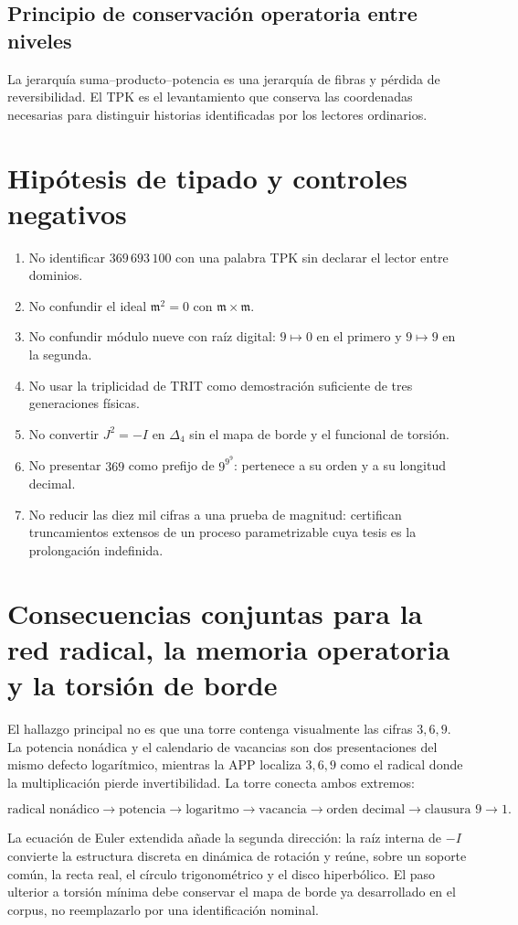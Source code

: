 \subsection{Principio de conservación operatoria entre niveles}

La jerarquía suma–producto–potencia es una jerarquía de fibras y pérdida de reversibilidad. El TPK es el levantamiento que conserva las coordenadas necesarias para distinguir historias identificadas por los lectores ordinarios.


\section{Hipótesis de tipado y controles negativos}

\begin{enumerate}
\item No identificar \(369\,693\,100\) con una palabra TPK sin declarar el lector entre dominios.
\item No confundir el ideal \(\mathfrak m^2=0\) con \(\mathfrak m\times\mathfrak m\).
\item No confundir módulo nueve con raíz digital: \(9\mapsto0\) en el primero y \(9\mapsto9\) en la segunda.
\item No usar la triplicidad de TRIT como demostración suficiente de tres generaciones físicas.
\item No convertir \(J^2=-I\) en \(\Delta_4\) sin el mapa de borde y el funcional de torsión.
\item No presentar \(369\) como prefijo de \(9^{9^9}\): pertenece a su orden y a su longitud decimal.
\item No reducir las diez mil cifras a una prueba de magnitud: certifican truncamientos extensos de un proceso parametrizable cuya tesis es la prolongación indefinida.
\end{enumerate}

\section{Consecuencias conjuntas para la red radical, la memoria operatoria y la torsión de borde}

El hallazgo principal no es que una torre contenga visualmente las cifras \(3,6,9\). La potencia nonádica y el calendario de vacancias son dos presentaciones del mismo defecto logarítmico, mientras la APP localiza \(3,6,9\) como el radical donde la multiplicación pierde invertibilidad. La torre conecta ambos extremos:

\[
\text{radical nonádico}
\longrightarrow
\text{potencia}
\longrightarrow
\text{logaritmo}
\longrightarrow
\text{vacancia}
\longrightarrow
\text{orden decimal}
\longrightarrow
\text{clausura }9\to1.
\]

La ecuación de Euler extendida añade la segunda dirección: la raíz interna de \(-I\) convierte la estructura discreta en dinámica de rotación y reúne, sobre un soporte común, la recta real, el círculo trigonométrico y el disco hiperbólico. El paso ulterior a torsión mínima debe conservar el mapa de borde ya desarrollado en el corpus, no reemplazarlo por una identificación nominal.

